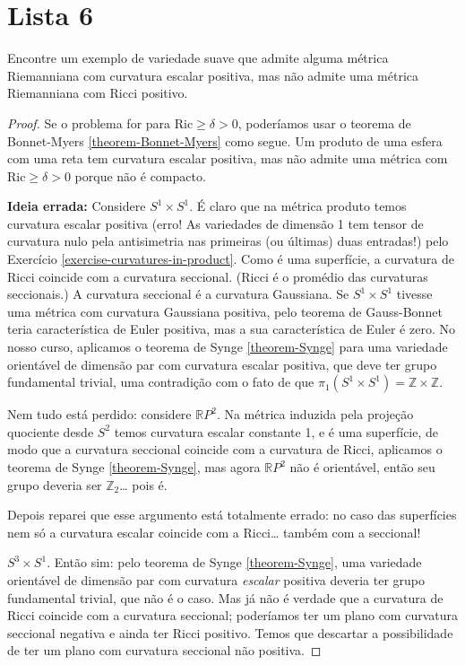 \documentclass{book}
\begin{document}
\section{Lista 6}
\label{section-lista-6}

\begin{exercise}
\label{exercise-posit-scala-but-no-posit}
Encontre um exemplo de variedade suave que
admite alguma métrica Riemanniana com
curvatura escalar positiva, mas não admite
uma métrica Riemanniana com Ricci
positivo.
\end{exercise}

\begin{proof}
Se o problema for para $\text{Ric}\geq
\delta>0$, poderíamos usar o teorema de
Bonnet-Myers \ref{theorem-Bonnet-Myers} como
segue. Um produto de uma esfera com
uma reta tem curvatura escalar positiva, mas
não admite uma métrica com
$\text{Ric}\geq\delta>0$ porque não é
compacto.

{\bf Ideia errada:} Considere $S^1\times
S^1$. É claro que na métrica produto
temos curvatura escalar positiva (erro! As
variedades de dimensão 1 tem tensor
de curvatura nulo pela antisimetria nas
primeiras (ou últimas) duas entradas!)
pelo Exercício
\ref{exercise-curvatures-in-product}. Como é
uma superfície, a
curvatura de Ricci coincide com a curvatura
seccional. (Ricci é o promédio das
curvaturas seccionais.) A curvatura seccional
é a curvatura Gaussiana. Se
$S^1\times S^1$ tivesse uma métrica com
curvatura Gaussiana positiva, pelo
teorema de Gauss-Bonnet teria característica
de Euler positiva, mas a sua
característica de Euler é zero. No nosso
curso, aplicamos o teorema de Synge
\ref{theorem-Synge} para uma variedade
orientável de dimensão par com curvatura
escalar positiva, que deve ter grupo
fundamental trivial, uma contradição com o
fato de que $\pi_{1}(S^1\times
S^1)=\mathbb{Z}\times\mathbb{Z}$.

Nem tudo está perdido: considere
$\mathbb{R}P^{2}$. Na métrica induzida pela
projeção quociente desde $S^2$ temos
curvatura escalar constante 1, e é uma
superfície, de modo que a curvatura seccional
coincide com a curvatura de Ricci,
aplicamos o teorema de Synge
\ref{theorem-Synge}, mas agora
$\mathbb{R}P^{2}$
não é orientável, então seu grupo deveria ser
$\mathbb{Z}_2$… pois é.

Depois reparei que esse argumento está
totalmente errado: no caso das
superfícies nem só a curvatura escalar
coincide com a Ricci… também com a
seccional!

 $S^3\times S^1$. Então sim: pelo teorema de
Synge \ref{theorem-Synge}, uma variedade
orientável de dimensão par com
curvatura {\it escalar} positiva deveria ter
grupo fundamental trivial, que não
é o caso. Mas já não é verdade que a
curvatura de Ricci coincide com a curvatura
 seccional; poderíamos ter um plano com
 curvatura seccional negativa e ainda ter
Ricci positivo. Temos que descartar a
possibilidade de ter um plano com
curvatura seccional não positiva.
\end{proof}
\end{document}
